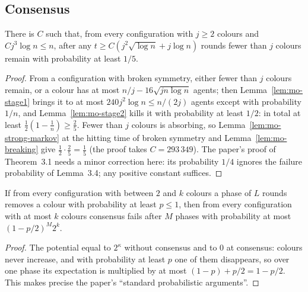 \subsection{Consensus}

\begin{lemma}\label{lem:mo-phase}
\leanok
{}
There is $C$ such that, from every configuration with $j\ge2$ colours and $Cj^3\log n\le n$,
after any $t\ge C(j^2\sqrt{\log n}+j\log n)$ rounds fewer than $j$ colours remain with probability
at least $1/5$.
\end{lemma}
\begin{proof}\leanok
From a configuration with broken symmetry, either fewer than $j$ colours remain, or a colour has
at most $n/j-16\sqrt{jn\log n}$ agents; then Lemma~\ref{lem:mo-stage1} brings it to at most
$240j^2\log n\le n/(2j)$ agents except with probability $1/n$, and Lemma~\ref{lem:mo-stage2} kills
it with probability at least $1/2$: in total at least $\frac12(1-\frac1n)\ge\frac25$. Fewer than
$j$ colours is absorbing, so Lemma~\ref{lem:mo-strong-markov} at the hitting time of broken
symmetry and Lemma~\ref{lem:mo-breaking} give $\frac12\cdot\frac25=\frac15$ (the proof takes
$C=293\,349$). The paper's proof of Theorem~3.1 needs a minor correction here: its probability
$1/4$ ignores the failure probability of Lemma~3.4; any positive constant suffices.
\end{proof}

\begin{lemma}\label{lem:mo-phases}
\leanok
{}
If from every configuration with between $2$ and $k$ colours a phase of $L$ rounds removes a
colour with probability at least $p\le1$, then from every configuration with at most $k$ colours
consensus fails after $M$ phases with probability at most $(1-p/2)^M2^k$.
\end{lemma}
\begin{proof}\leanok
The potential equal to $2^{\kappa}$ without consensus and to $0$ at consensus: colours never
increase, and with probability at least $p$ one of them disappears, so over one phase its
expectation is multiplied by at most $(1-p)+p/2=1-p/2$. This makes precise the paper's
``standard probabilistic arguments''.
\end{proof}

